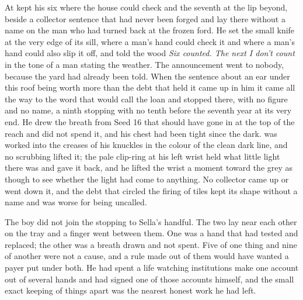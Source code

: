 At   kept his six where the house could check and the seventh at the lip beyond, beside a collector sentence that had never been forged and lay there without a name on the man who had turned back at the frozen ford. He set the small knife at the very edge of its sill, where a man's hand could check it and where a man's hand could also slip it off, and told the wood \emph{Six counted. The next I don't count} in the tone of a man stating the weather. The announcement went to nobody, because the yard had already been told. When the sentence about an ear under this roof being worth more than the debt that held it came up in him it came all the way to the word that would call the loan and stopped there, with no figure and no name, a ninth stopping with no tenth before the seventh year at its very end. He drew the breath from Seed 16 that should have gone in at the top of the reach and did not spend it, and his chest had been tight since the dark.  was worked into the creases of his knuckles in the colour of the clean dark line, and no scrubbing lifted it; the pale clip-ring at his left wrist held what little light there was and gave it back, and he lifted the wrist a moment toward the grey as though to see whether the light had come to anything. No collector came up  or went down it, and the debt that circled the firing of tiles kept its shape without a name and was worse for being uncalled.

The boy did not join the stopping to Sella's handful. The two lay near each other on the tray and a finger went between them. One was a hand that had tested and replaced; the other was a breath drawn and not spent. Five of one thing and nine of another were not a cause, and a rule made out of them would have wanted a payer put under both. He had spent a life watching institutions make one account out of several hands and had signed one of those accounts himself, and the small exact keeping of things apart was the nearest honest work he had left.

\scenebreak

